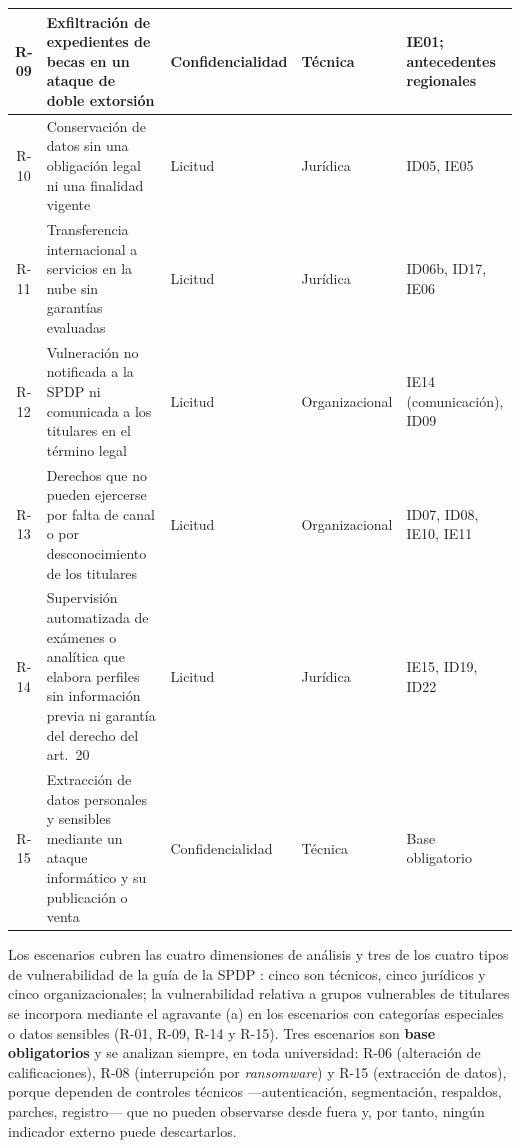 \begin{table}[htbp]
\begin{tabularx}{\textwidth}{|c|L|>{\raggedright\arraybackslash}p{2.05cm}|>{\raggedright\arraybackslash}p{1.8cm}|>{\raggedright\arraybackslash}p{2.1cm}|}
    R-09 & Exfiltración de expedientes de becas en un ataque de doble extorsión & Confidencialidad & Técnica & IE01; antecedentes regionales \\ \hline
    R-10 & Conservación de datos sin una obligación legal ni una finalidad vigente & Licitud & Jurídica & ID05, IE05 \\ \hline
    R-11 & Transferencia internacional a servicios en la nube sin garantías evaluadas & Licitud & Jurídica & ID06b, ID17, IE06 \\ \hline
    R-12 & Vulneración no notificada a la SPDP ni comunicada a los titulares en el término legal & Licitud & Organizacional & IE14 (comunicación), ID09 \\ \hline
    R-13 & Derechos que no pueden ejercerse por falta de canal o por desconocimiento de los titulares & Licitud & Organizacional & ID07, ID08, IE10, IE11 \\ \hline
    R-14 & Supervisión automatizada de exámenes o analítica que elabora perfiles sin información previa ni garantía del derecho del art.~20 & Licitud & Jurídica & IE15, ID19, ID22 \\ \hline
    R-15 & Extracción de datos personales y sensibles mediante un ataque informático y su publicación o venta & Confidencialidad & Técnica & Base obligatorio \\ \hline
  \end{tabularx}
  \raggedright
\end{table}

Los escenarios cubren las cuatro dimensiones de análisis y tres de los cuatro tipos de vulnerabilidad de la guía de la SPDP \cite{spdp2026guiav2}: cinco son técnicos, cinco jurídicos y cinco organizacionales; la vulnerabilidad relativa a grupos vulnerables de titulares se incorpora mediante el agravante (a) en los escenarios con categorías especiales o datos sensibles (R-01, R-09, R-14 y R-15). Tres escenarios son \textbf{base obligatorios} y se analizan siempre, en toda universidad: R-06 (alteración de calificaciones), R-08 (interrupción por \textit{ransomware}) y R-15 (extracción de datos), porque dependen de controles técnicos ---autenticación, segmentación, respaldos, parches, registro--- que no pueden observarse desde fuera y, por tanto, ningún indicador externo puede descartarlos.

